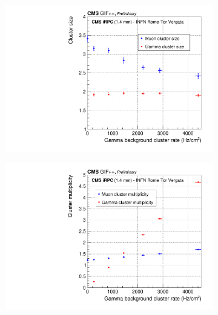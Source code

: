 	\begin{figure}[H]
		\begin{subfigure}{.5\linewidth}
		    \centering
			\includegraphics[width = \linewidth]{fig/chapt6/CMS-iRPC-INFN-ClusterSize_vs_Rate.pdf}
			\caption{\label{fig:iRPC_INFN_clust:A}}
		\end{subfigure}
		\begin{subfigure}{.5\linewidth}
		    \centering
			\includegraphics[width = \linewidth]{fig/chapt6/CMS-iRPC-INFN-ClusterMultiplicity_vs_Rate.pdf}
			\caption{\label{fig:iRPC_INFN_clust:B}}
		\end{subfigure}
		\begin{subfigure}{.5\linewidth}
		    \centering

\end{subfigure}
\end{figure}

